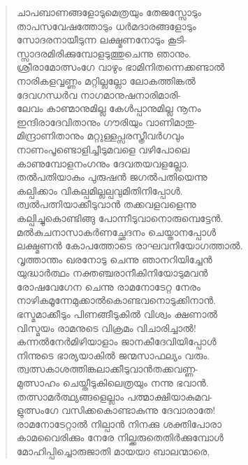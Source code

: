 \begin{verse}
ചാപബാണങ്ങളോടുമെത്രയും തേജസ്സോടും\\
താപസവേഷത്തോടും ധര്‍മദാരങ്ങളോടും\\
സോദരനായീടുന്ന ലക്ഷ്മണനോടും കൂടി-\\
സ്സാദരമിരിക്കുമ്പോളടുത്തുചെന്നു ഞാനും.\\
ശ്രീരാമോത്സംഗേ വാഴും ഭാമിനിതന്നെക്കണ്ടാല്‍\\
നാരികളവ്വണ്ണം മറ്റില്ലല്ലോ ലോകത്തിങ്കല്‍\\
ദേവഗന്ധര്‍വ നാഗമാനുഷനാരിമാരി-\\
ലേവം കാണ്മാനുമില്ല കേള്‍പ്പാനുമില്ല നൂനം\\
ഇന്ദിരാദേവിതാനും ഗൗരിയും വാണിമാതു-\\
മിന്ദ്രാണിതാനും മറ്റുള്ളപ്സരസ്ത്രീവര്‍ഗവും\\
നാണംപൂണ്ടൊളിച്ചീടുമവളെ വഴിപോലെ\\
കാണുമ്പോളനംഗനും ദേവതയവളല്ലോ.\\
തല്‍പതിയാകും പുരുഷന്‍ ജഗല്‍പതിയെന്നു\\
കല്പിക്കാം വികല്പമില്ലല്പവുമിതിനിപ്പോള്‍.\\
ത്വല്‍പത്നിയാക്കീടുവാന്‍ തക്കവളവളെന്നു\\
കല്പിച്ചുകൊണ്ടിങ്ങു പോന്നീടുവാനൊരുമ്പെട്ടേന്‍.\\
മല്‍കുചനാസാകര്‍ണച്ഛേദനം ചെയ്താനപ്പോള്‍\\
ലക്ഷ്മണന്‍ കോപത്തോടെ രാഘവനിയോഗത്താല്‍.\\
വൃത്താന്തം ഖരനോടു ചെന്നു ഞാനറിയിച്ചേന്‍\\
യുദ്ധാര്‍ത്ഥം നക്തഞ്ചരാനീകിനിയോടുമവന്‍\\
രോഷവേഗേന ചെന്നു രാമനോടേറ്റ നേരം\\
നാഴികമൂന്നേമുക്കാല്‍കൊണ്ടവനൊടുക്കിനാന്‍.\\
ഭസ്മമാക്കീടും പിണങ്ങീടുകില്‍ വിശ്വം ക്ഷണാല്‍\\
വിസ്മയം രാമനുടെ വിക്രമം വിചാരിച്ചാല്‍!\\
കന്നല്‍നേര്‍മിഴിയാളാം ജാനകീദേവിയിപ്പോള്‍\\
നിന്നുടെ ഭാര്യയാകില്‍ ജന്മസാഫല്യം വരും.\\
ത്വത്സകാശത്തിങ്കലാക്കീടുവാന്‍തക്കവണ്ണ-\\
മുത്സാഹം ചെയ്തീടുകിലെത്രയും നന്നു ഭവാന്‍.\\
തത്സാമര്‍ത്ഥ്യങ്ങളെല്ലാം പത്മാക്ഷിയാകുമവ-\\
ളുത്സംഗേ വസിക്കകൊണ്ടാകുന്നു ദേവാരാതേ!\\
രാമനോടേറ്റാല്‍ നില്പാന്‍ നിനക്കു ശക്തിപോരാ\\
കാമവൈരിക്കും നേരേ നില്ക്കരുതെതിര്‍ക്കുമ്പോള്‍\\
മോഹിപ്പിച്ചൊരുജാതി മായയാ ബാലന്മാരെ,\\

\end{verse}
